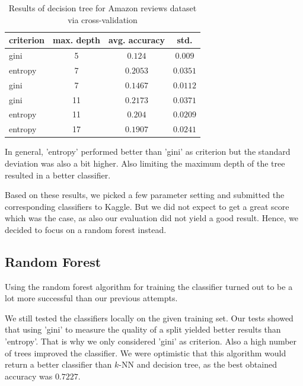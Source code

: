 \documentclass[a4paper,11pt]{article}
\begin{document}
        \begin{table}[h!]
            \centering
            \begin{tabular}[h]{l|c|c|c}
                criterion & max. depth & avg. accuracy & std. \\
                \hline
                gini & 5 & $0.124$ & $0.009$ \\
                \hline
                entropy & 7 & $0.2053$ & $0.0351$ \\
                \hline
                gini & 7 & $0.1467$ & $0.0112$ \\
                \hline
                gini & 11 & $0.2173$ & $0.0371$ \\
                \hline
                entropy & 11 & $0.204$ & $0.0209$ \\
                \hline
                entropy & 17 & $0.1907$ & $0.0241$
            \end{tabular}
            \caption{Results of decision tree for Amazon reviews dataset via cross-validation}
            \label{tbl:decision-tree_amazon_cross-validation}
        \end{table}
        
        In general, 'entropy' performed better than 'gini' as criterion but the standard deviation was also a bit higher. Also limiting the maximum depth of the tree resulted in a better classifier.
        
        Based on these results, we picked a few parameter setting and submitted the corresponding classifiers to Kaggle. But we did not expect to get a great score which was the case, as also our evaluation did not yield a good result. Hence, we decided to focus on a random forest instead.
        
    \subsection{Random Forest}
        Using the random forest algorithm for training the classifier turned out to be a lot more successful than our previous attempts. 
        
        
        We still tested the classifiers locally on the given training set. Our tests showed that using 'gini' to measure the quality of a split yielded better results than 'entropy'. That is why we only considered 'gini' as criterion. Also a high number of trees improved the classifier. We were optimistic that this algorithm would return a better classifier than $k$-NN and decision tree, as the best obtained accuracy was $0.7227$. 
        
\end{document}
